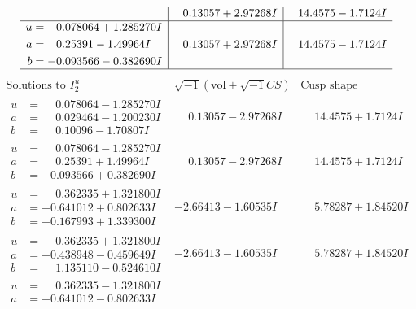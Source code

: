 \documentclass[1p]{elsarticle_modified}
\theoremstyle{definition}
\newcommand{\I}{\sqrt{-1}}
\begin{document}
$$\begin{array}{c|c|c}
 & \phantom{-}0.13057 + 2.97268 I & \phantom{-}14.4575 - 1.7124 I \\ \hline\begin{aligned}
u &= \phantom{-}0.078064 + 1.285270 I \\
a &= \phantom{-}0.25391 - 1.49964 I \\
b &= -0.093566 - 0.382690 I\end{aligned}
 & \phantom{-}0.13057 + 2.97268 I & \phantom{-}14.4575 - 1.7124 I\\
 \hline 
 \end{array}$$\newpage$$\begin{array}{c|c|c}  
\text{Solutions to }I^u_{2}& \I (\text{vol} + \sqrt{-1}CS) & \text{Cusp shape}\\
 \hline 
\begin{aligned}
u &= \phantom{-}0.078064 - 1.285270 I \\
a &= \phantom{-}0.029464 - 1.200230 I \\
b &= \phantom{-}0.10096 - 1.70807 I\end{aligned}
 & \phantom{-}0.13057 - 2.97268 I & \phantom{-}14.4575 + 1.7124 I \\ \hline\begin{aligned}
u &= \phantom{-}0.078064 - 1.285270 I \\
a &= \phantom{-}0.25391 + 1.49964 I \\
b &= -0.093566 + 0.382690 I\end{aligned}
 & \phantom{-}0.13057 - 2.97268 I & \phantom{-}14.4575 + 1.7124 I \\ \hline\begin{aligned}
u &= \phantom{-}0.362335 + 1.321800 I \\
a &= -0.641012 + 0.802633 I \\
b &= -0.167993 + 1.339300 I\end{aligned}
 & -2.66413 - 1.60535 I & \phantom{-}5.78287 + 1.84520 I \\ \hline\begin{aligned}
u &= \phantom{-}0.362335 + 1.321800 I \\
a &= -0.438948 - 0.459649 I \\
b &= \phantom{-}1.135110 - 0.524610 I\end{aligned}
 & -2.66413 - 1.60535 I & \phantom{-}5.78287 + 1.84520 I \\ \hline\begin{aligned}
u &= \phantom{-}0.362335 - 1.321800 I \\
a &= -0.641012 - 0.802633 I \\

\end{aligned}
\end{array}$$
\end{document}
